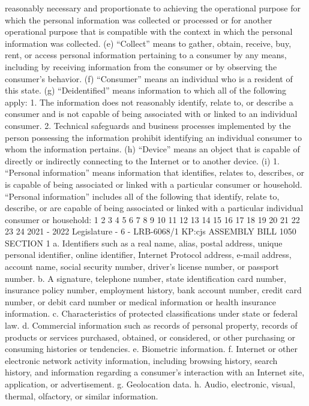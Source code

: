 reasonably necessary and proportionate to achieving the operational purpose for
which the personal information was collected or processed or for another operational
purpose that is compatible with the context in which the personal information was
collected.
(e) “Collect” means to gather, obtain, receive, buy, rent, or access personal
information pertaining to a consumer by any means, including by receiving
information from the consumer or by observing the consumer's behavior.
(f) “Consumer” means an individual who is a resident of this state.
(g) “Deidentified” means information to which all of the following apply:
1. The information does not reasonably identify, relate to, or describe a
consumer and is not capable of being associated with or linked to an individual
consumer.
2. Technical safeguards and business processes implemented by the person
possessing the information prohibit identifying an individual consumer to whom the
information pertains.
(h) “Device” means an object that is capable of directly or indirectly connecting
to the Internet or to another device.
(i) 1. “Personal information” means information that identifies, relates to,
describes, or is capable of being associated or linked with a particular consumer or
household. “Personal information” includes all of the following that identify, relate
to, describe, or are capable of being associated or linked with a particular individual
consumer or household:
1
2
3
4
5
6
7
8
9
10
11
12
13
14
15
16
17
18
19
20
21
22
23
24
2021 - 2022 Legislature - 6 - LRB-6068/1
KP:cjs
 ASSEMBLY BILL 1050 SECTION 1
a. Identifiers such as a real name, alias, postal address, unique personal
identifier, online identifier, Internet Protocol address, e-mail address, account
name, social security number, driver's license number, or passport number.
b. A signature, telephone number, state identification card number, insurance
policy number, employment history, bank account number, credit card number, or
debit card number or medical information or health insurance information.
c. Characteristics of protected classifications under state or federal law.
d. Commercial information such as records of personal property, records of
products or services purchased, obtained, or considered, or other purchasing or
consuming histories or tendencies.
e. Biometric information.
f. Internet or other electronic network activity information, including browsing
history, search history, and information regarding a consumer's interaction with an
Internet site, application, or advertisement.
g. Geolocation data.
h. Audio, electronic, visual, thermal, olfactory, or similar information.
